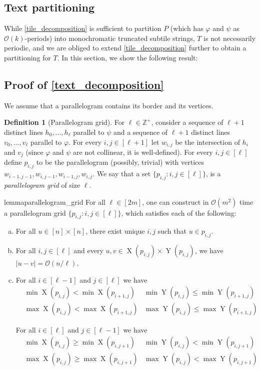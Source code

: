 \documentclass[11pt, letterpaper]{article}
\theoremstyle{plain}
\theoremstyle{definition}
\newtheorem{definition}{Definition}
\theoremstyle{remark}
\newcommand{\Z}{\mathbb{Z}}
\renewcommand{\O}{\mathcal{O}}
\renewcommand{\phi}{\varphi}
\newcommand{\eq}[1]{\begin{align*} #1 \end{align*}}
\DeclareMathOperator*{\X}{X}
\DeclareMathOperator*{\Y}{Y}
\newcommand{\absolute}[1]{\left\lvert#1\right\rvert}
\begin{document}
\subsection{Text partitioning}
While \cref{tile_decomposition} is sufficient to partition $P$ (which has $\phi$ and $\psi$ as $\O(k)$-periods) into monochromatic truncated subtile strings, $T$ is not necessarily periodic, and we are obliged to extend \cref{tile_decomposition} further to obtain a partitioning for $T$. In this section, we show the following result:

\TextDecomposition


\subsection{Proof of \cref{text_decomposition}}
We assume that a parallelogram contains its border and its vertices.

\begin{definition}[Parallelogram grid]
For $\ell \in \Z^+$, consider a sequence of $\ell+1$  distinct lines $h_0, \dots, h_\ell$ parallel to $\psi$ and a sequence of $\ell+1$ distinct lines $v_0, \dots, v_\ell$ parallel to $\phi$. For every $i, j \in [\ell + 1]$ let $w_{i, j}$ be the intersection of $h_i$ and $v_j$ (since $\phi$ and $\psi$ are not collinear, it is well-defined). For every $i, j \in [\ell]$ define $p_{i, j}$ to be the parallelogram (possibly, trivial) with vertices $w_{i-1, j-1}, w_{i, j-1}, w_{i-1, j}, w_{i, j }$. We say that a set $\{p_{i,j} : i,j \in [\ell]\}$, is a \emph{parallelogram grid} of size $\ell$. 
\end{definition}

\begin{restatable}{lemma}{parallelogram_grid}\label{lm:parallelogram_grid}
For all $\ell \in [2m]$, one can construct in $\O(m^2)$ time a parallelogram grid $\{p_{i,j} : i,j \in [\ell]\}$, which satisfies each of the following:
\begin{enumerate}[(a)]
\item \label{it:unique} For all $u \in [n] \times [n]$, there exist unique $i,j$ such that $u \in p_{i,j}$.

\item \label{it:small_parallelogram} For all $i, j \in [\ell]$ and every $u, v \in \X(p_{i, j}) \times \Y(p_{i, j})$, we have $\absolute{u - v} = \O(n / \ell)$.

\item \label{it:monotonicity} For all $i \in [\ell - 1]$ and $j \in [\ell]$ we have
	\eq{
	&\min \X(p_{i, j}) < \min \X(p_{i + 1, j}) &\min \Y(p_{i, j}) \le \min \Y(p_{i + 1, j}) \\
	&\max \X(p_{i, j}) < \max \X(p_{i + 1, j})  &\max \Y(p_{i, j}) \le \max \Y(p_{i + 1, j})
	}
	
For all $i \in [\ell]$ and $j \in [\ell - 1]$ we have
	\eq{
		&\min \X(p_{i, j}) \ge \min \X(p_{i, j + 1})  &\min \Y(p_{i, j}) < \min \Y(p_{i, j + 1}) \\
		&\max \X(p_{i, j}) \ge \max \X(p_{i, j + 1})  &\max \Y(p_{i, j}) < \max \Y(p_{i, j + 1})
	}
\end{enumerate}
\end{restatable}
\end{document}
